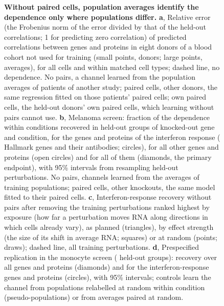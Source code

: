 \documentclass[pdflatex,sn-vancouver-num,iicol]{sn-jnl}
\begin{document}
\begin{figure}[tp]
\centering

\caption{\textbf{Without paired cells, population averages identify the dependence only where populations differ.}
\textbf{a}, Relative error (the Frobenius norm of the error divided by that of the held-out correlations; 1 for predicting zero correlation) of predicted correlations between \XsGenes{} genes and \XsProteins{} proteins in eight donors of a blood cohort not used for training (small points, donors; large points, averages), for all cells and within matched cell types; dashed line, no dependence. No pairs, a channel learned from the population averages of \XsPatients{} patients of another study; paired cells, other donors, the same regression fitted on those patients' paired cells; own paired cells, the held-out donors' own paired cells, which learning without pairs cannot use.
\textbf{b}, Melanoma screen: fraction of the dependence within conditions recovered in \PtGroups{} held-out groups of knocked-out gene and condition, for the genes and proteins of the interferon response (\PgIfnGenes{} Hallmark genes and their antibodies; circles), for all other genes and proteins (open circles) and for all of them (diamonds, the primary endpoint), with 95\% intervals from resampling held-out perturbations. No pairs, channels learned from the averages of \PtTrainPops{} training populations; paired cells, other knockouts, the same model fitted to their paired cells.
\textbf{c}, Interferon-response recovery without pairs after removing the training perturbations ranked highest by exposure (how far a perturbation moves RNA along directions in which cells already vary), as planned (triangles), by effect strength (the size of its shift in average RNA; squares) or at random (points; \DsDraws{} draws); dashed line, all training perturbations.
\textbf{d}, Prespecified replication in the monocyte screen (\RpGroups{} held-out groups): recovery over all genes and proteins (diamonds) and for the interferon-response genes and proteins (circles), with 95\% intervals; controls learn the channel from populations relabelled at random within condition (pseudo-populations) or from averages paired at random.}
\label{fig:pairfree}
\end{figure}
\end{document}
